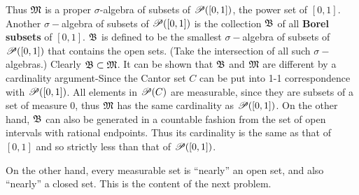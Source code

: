 \begin{rmk}%
	Thus $\mathfrak{M}$ is a proper $\sigma$-algebra of subsets of $\mathscr{P}([0,1])$, 
	the power set of $[0,1]$. Another $\sigma-$algebra of subsets of 
	$\mathscr{P}([0,1])$ is the collection $\mathfrak{B}$ of all \textbf{Borel subsets} of 
	$[0,1]$. $\mathfrak{B}$ is defined to be the smallest $\sigma-$algebra of subsets 
	of $\mathscr{P}([0,1])$ that contains the open sets. (Take the intersection of all 
	such $\sigma-$algebras.) Clearly $\mathfrak{B}\subset\mathfrak{M}$. It can be shown that $\mathfrak{B}$ 
	and $\mathfrak{M}$ are different by a cardinality argument-Since the Cantor set $C$ 
	can be put into 1-1 correspondence with $\mathscr{P}([0,1])$. All elements in 
	$\mathscr{P}(C)$ are measurable, since they are subsets of a set of measure 0, 
	thus $\mathfrak{M}$ has the same cardinality as $\mathscr{P}([0,1])$. On the other hand, $\mathfrak{B}$ 
	can also be generated in a countable fashion from the set of open intervals 
	with rational endpoints. Thus its cardinality is the same as that of 
	$[0,1]$ and so strictly less than that of $\mathscr{P}([0,1])$. 

	On the other hand, every measurable set is ``nearly'' an open set, and 
	also ``nearly'' a closed set. This is the content of the next problem. 
\end{rmk}


